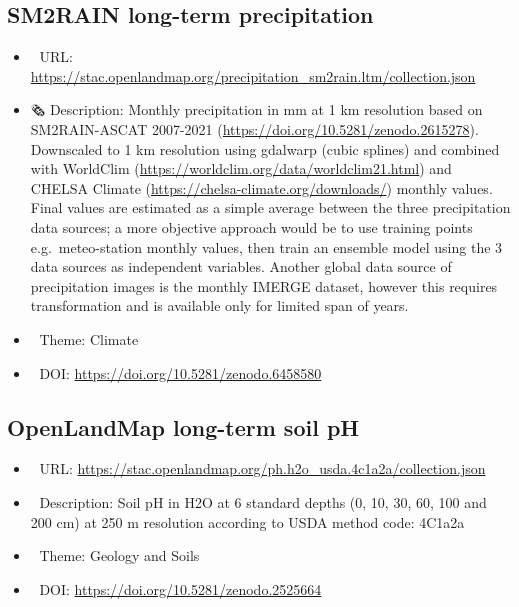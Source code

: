 \documentclass[
  graybox,natbib,nospthms]{svmono}
\providecommand{\tightlist}{%
  \setlength{\itemsep}{0pt}\setlength{\parskip}{0pt}}
\providecommand{\tightlist}{\setlength{\itemsep}{0pt}\setlength{\parskip}{0pt}}
\begin{document}
\hypertarget{sm2rain-long-term-precipitation}{%
\subsection{SM2RAIN long-term precipitation}\label{sm2rain-long-term-precipitation}}

\begin{itemize}
\tightlist
\item
  🔗 URL: \url{https://stac.openlandmap.org/precipitation_sm2rain.ltm/collection.json}
\item
  🗞 Description: Monthly precipitation in mm at 1 km resolution based on SM2RAIN-ASCAT 2007-2021 (\url{https://doi.org/10.5281/zenodo.2615278}). Downscaled to 1 km resolution using gdalwarp (cubic splines) and combined with WorldClim (\url{https://worldclim.org/data/worldclim21.html}) and CHELSA Climate (\url{https://chelsa-climate.org/downloads/}) monthly values. Final values are estimated as a simple average between the three precipitation data sources; a more objective approach would be to use training points e.g.~meteo-station monthly values, then train an ensemble model using the 3 data sources as independent variables. Another global data source of precipitation images is the monthly IMERGE dataset, however this requires transformation and is available only for limited span of years.
\item
  📝 Theme: Climate
\item
  📂 DOI: \url{https://doi.org/10.5281/zenodo.6458580}
\end{itemize}

\hypertarget{openlandmap-long-term-soil-ph}{%
\subsection{OpenLandMap long-term soil pH}\label{openlandmap-long-term-soil-ph}}

\begin{itemize}
\tightlist
\item
  🔗 URL: \url{https://stac.openlandmap.org/ph.h2o_usda.4c1a2a/collection.json}
\item
  📰 Description: Soil pH in H2O at 6 standard depths (0, 10, 30, 60, 100 and 200 cm) at 250 m resolution according to USDA method code: 4C1a2a
\item
  📝 Theme: Geology and Soils
\item
  📂 DOI: \url{https://doi.org/10.5281/zenodo.2525664}
\end{itemize}
\end{document}
